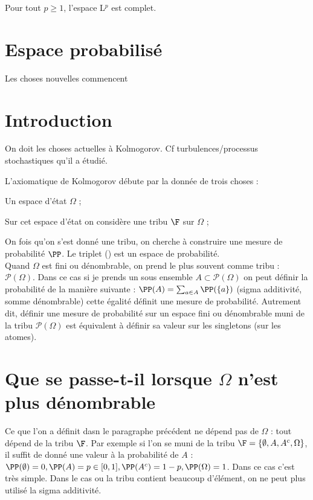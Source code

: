 \ep

\ep

\bp
Pour tout $p \geq 1$, l'espace L$^p$ est complet.
\ep


\section{Espace probabilisé}

Les choses nouvelles commencent 

\bigskip

\section*{Introduction}

On doit les choses actuelles à Kolmogorov. Cf turbulences/processus stochastiques qu'il a étudié.

\bigskip

L'axiomatique de Kolmogorov débute par la donnée de trois choses : 
\ben
    \item Un espace d'état $\Omega$ ;
    \item Sur cet espace d'état on considère une tribu $\F$ sur $\Omega$ ;
    \item On fois qu'on s'est donné une tribu, on cherche à construire une mesure de probabilité $\PP$.
\een
Le triplet () est un espace de probabilité.\\
Quand $\Omega$ est fini ou dénombrable, on prend le plus souvent comme tribu : $\mathcal{P}(\Omega)$. Dans ce cas si je prends un sous ensemble $A \subset \mathcal{P}(\Omega)$ on peut définir la probabilité de la manière suivante : $\PP(A)= \sum_{a\in A} \PP(\{a\})$ (sigma additivité, somme dénombrable) cette égalité définit une mesure de probabilité. Autrement dit, définir une mesure de probabilité sur un espace fini ou dénombrable muni de la tribu $\mathcal{P}(\Omega)$ est équivalent à définir sa valeur sur les singletons (sur les atomes).

\section*{Que se passe-t-il lorsque $\Omega$ n'est plus dénombrable}
Ce que l'on a définit dasn le paragraphe précédent ne dépend pas de $\Omega$ : tout dépend de la tribu $\F$. Par exemple si l'on se muni de la tribu $\F = \{\emptyset, A, A^c, \Omega\}$, il suffit de donné une valeur à la probabilité de $A$ : $\PP(\emptyset) = 0, \PP(A) = p \in [0,1], \PP(A^c) = 1-p, \PP(\Omega) = 1$. Dans ce cas c'est très simple. Dans le cas ou la tribu contient beaucoup d'élément, on ne peut plus utilisé la sigma additivité.

